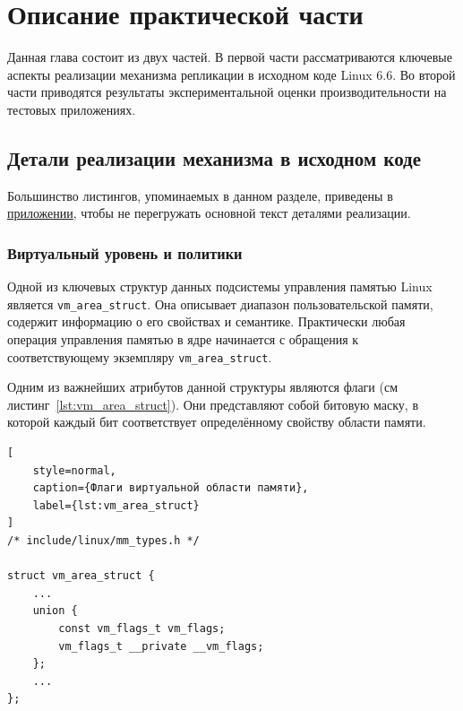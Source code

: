 \section{Описание практической части}
\label{sec:Chapter4} 


Данная глава состоит из двух частей. В первой части рассматриваются ключевые аспекты реализации механизма репликации в исходном коде Linux 6.6. Во второй части приводятся результаты экспериментальной оценки производительности на тестовых приложениях.

\subsection{Детали реализации механизма в исходном коде}

Большинство листингов, упоминаемых в данном разделе, приведены в \hyperlink{sec:Appendix_hypertarget}{приложении}, чтобы не перегружать основной текст деталями реализации.

\subsubsection{Виртуальный уровень и политики}

Одной из ключевых структур данных подсистемы управления памятью Linux является \texttt{vm\_area\_struct}. Она описывает диапазон пользовательской памяти, содержит информацию о его свойствах и семантике. Практически любая операция управления памятью в ядре начинается с обращения к соответствующему экземпляру \texttt{vm\_area\_struct}.

Одним из важнейших атрибутов данной структуры являются флаги (см листинг~\ref{lst:vm_area_struct}). Они представляют собой битовую маску, в которой каждый бит соответствует определённому свойству области памяти.

\begin{lstlisting}[
    style=normal,
    caption={Флаги виртуальной области памяти},
    label={lst:vm_area_struct}
]
/* include/linux/mm_types.h */

struct vm_area_struct {
    ...
	union {
		const vm_flags_t vm_flags;
		vm_flags_t __private __vm_flags;
	};
    ...
};
\end{lstlisting}

